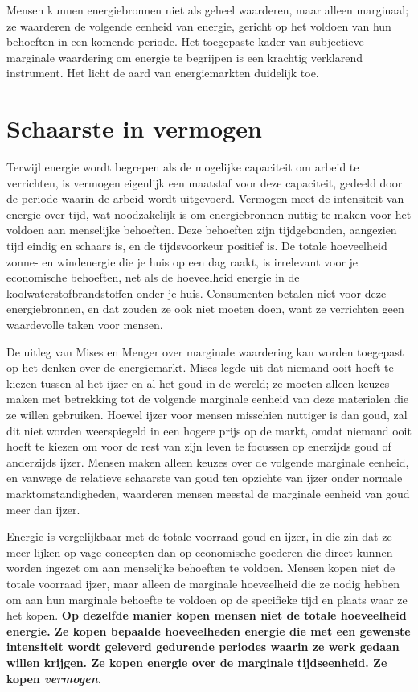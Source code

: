 Mensen kunnen energiebronnen niet als geheel waarderen, maar alleen marginaal; ze waarderen de volgende eenheid van energie, gericht op het voldoen van hun behoeften in een komende periode. Het toegepaste kader van subjectieve marginale waardering om energie te begrijpen is een krachtig verklarend instrument. Het licht de aard van energiemarkten duidelijk toe.

\hypertarget{schaarste-in-vermogen}{%
\section{Schaarste in vermogen}\label{schaarste-in-vermogen}}

Terwijl energie wordt begrepen als de mogelijke capaciteit om arbeid te verrichten, is vermogen eigenlijk een maatstaf voor deze capaciteit, gedeeld door de periode waarin de arbeid wordt uitgevoerd. Vermogen meet de intensiteit van energie over tijd, wat noodzakelijk is om energiebronnen nuttig te maken voor het voldoen aan menselijke behoeften. Deze behoeften zijn tijdgebonden, aangezien tijd eindig en schaars is, en de tijdsvoorkeur positief is. De totale hoeveelheid zonne- en windenergie die je huis op een dag raakt, is irrelevant voor je economische behoeften, net als de hoeveelheid energie in de koolwaterstofbrandstoffen onder je huis. Consumenten betalen niet voor deze energiebronnen, en dat zouden ze ook niet moeten doen, want ze verrichten geen waardevolle taken voor mensen.

De uitleg van Mises en Menger over marginale waardering kan worden toegepast op het denken over de energiemarkt. Mises legde uit dat niemand ooit hoeft te kiezen tussen al het ijzer en al het goud in de wereld; ze moeten alleen keuzes maken met betrekking tot de volgende marginale eenheid van deze materialen die ze willen gebruiken. Hoewel ijzer voor mensen misschien nuttiger is dan goud, zal dit niet worden weerspiegeld in een hogere prijs op de markt, omdat niemand ooit hoeft te kiezen om voor de rest van zijn leven te focussen op enerzijds goud of anderzijds ijzer. Mensen maken alleen keuzes over de volgende marginale eenheid, en vanwege de relatieve schaarste van goud ten opzichte van ijzer onder normale marktomstandigheden, waarderen mensen meestal de marginale eenheid van goud meer dan ijzer.

Energie is vergelijkbaar met de totale voorraad goud en ijzer, in die zin dat ze meer lijken op vage concepten dan op economische goederen die direct kunnen worden ingezet om aan menselijke behoeften te voldoen. Mensen kopen niet de totale voorraad ijzer, maar alleen de marginale hoeveelheid die ze nodig hebben om aan hun marginale behoefte te voldoen op de specifieke tijd en plaats waar ze het kopen. \textbf{Op dezelfde manier kopen mensen niet de totale hoeveelheid energie. Ze kopen bepaalde hoeveelheden energie die met een gewenste intensiteit wordt geleverd gedurende periodes waarin ze werk gedaan willen krijgen. Ze kopen energie over de marginale tijdseenheid. Ze kopen \textit{vermogen}.}

